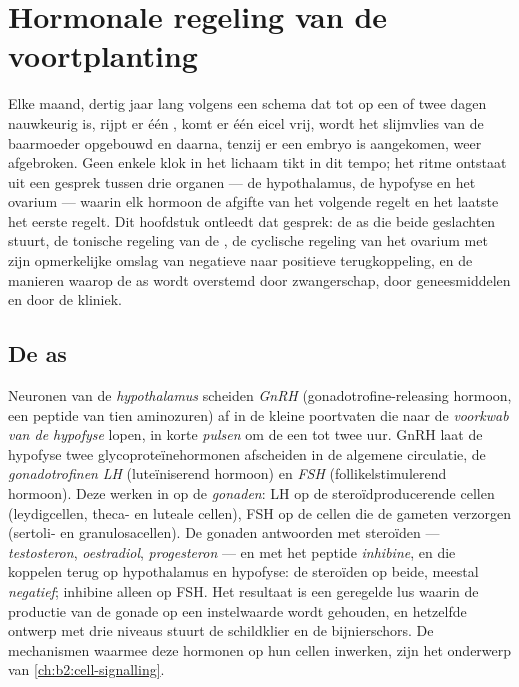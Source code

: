 \chapter{Hormonale regeling van de voortplanting}\label{ch:b2:reproductive-hormones}

Elke maand, dertig jaar lang volgens een schema dat tot op een of twee
dagen nauwkeurig is, rijpt er één , komt er één eicel vrij, wordt
het slijmvlies van de baarmoeder opgebouwd en daarna, tenzij er een embryo
is aangekomen, weer afgebroken. Geen enkele klok in het lichaam tikt in dit
tempo; het ritme ontstaat uit een gesprek tussen drie organen --- de
hypothalamus, de hypofyse en het ovarium --- waarin elk hormoon de afgifte
van het volgende regelt en het laatste het eerste regelt. Dit hoofdstuk
ontleedt dat gesprek: de as die beide geslachten stuurt, de tonische
regeling van de , de cyclische regeling van het ovarium met zijn
opmerkelijke omslag van negatieve naar positieve terugkoppeling, en de
manieren waarop de as wordt overstemd door zwangerschap, door
geneesmiddelen en door de kliniek.

\section{De as}

\begin{definition}\label{def:b2:reproductive-hormones:axis}
Neuronen van de \emph{hypothalamus} scheiden \emph{GnRH}
(gonadotrofine-releasing hormoon, een peptide van tien aminozuren) af in
de kleine poortvaten die naar de \emph{voorkwab van de hypofyse} lopen,
in korte \emph{pulsen} om de een tot twee uur. GnRH laat de hypofyse twee
glycoproteïnehormonen afscheiden in de algemene circulatie, de
\emph{gonadotrofinen} \emph{LH} (luteïniserend hormoon) en \emph{FSH}
(follikelstimulerend hormoon). Deze werken in op de \emph{gonaden}: LH op
de steroïdproducerende cellen (leydigcellen, theca- en luteale cellen), FSH
op de cellen die de gameten verzorgen (sertoli- en granulosacellen). De
gonaden antwoorden met steroïden ---
\emph{testosteron}, \emph{oestradiol}, \emph{progesteron} --- en met het
peptide \emph{inhibine}, en die koppelen terug op hypothalamus en hypofyse:
de steroïden op beide, meestal \emph{negatief}; inhibine alleen op FSH. Het
resultaat is een geregelde lus waarin de productie van de gonade op een
instelwaarde wordt gehouden, en hetzelfde ontwerp met drie niveaus stuurt de
schildklier en de bijnierschors. De mechanismen waarmee deze hormonen op hun
cellen inwerken, zijn het onderwerp van \cref{ch:b2:cell-signalling}.
\end{definition}

